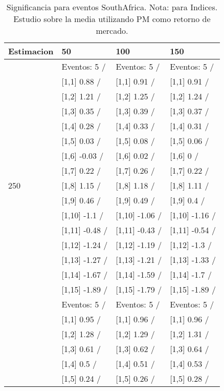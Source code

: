 \begin{table}

\caption{Significancia para eventos SouthAfrica. Nota: para Indices. Estudio sobre la media utilizando PM como retorno de mercado.}
\centering
\begin{tabular}[t]{llll}
\toprule
Estimacion & 50 & 100 & 150\\
\midrule
 & Eventos:  5 / & Eventos:  5 / & Eventos:  5 /\\
 & {}[1,1] 0.88  / & {}[1,1] 0.91  / & {}[1,1] 0.91  /\\
 & {}[1,2] 1.21  / & {}[1,2] 1.25  / & {}[1,2] 1.24  /\\
 & {}[1,3] 0.35  / & {}[1,3] 0.39  / & {}[1,3] 0.37  /\\
 & {}[1,4] 0.28  / & {}[1,4] 0.33  / & {}[1,4] 0.31  /\\
\addlinespace
 & {}[1,5] 0.03  / & {}[1,5] 0.08  / & {}[1,5] 0.06  /\\
 & {}[1,6] -0.03  / & {}[1,6] 0.02  / & {}[1,6] 0  /\\
 & {}[1,7] 0.22  / & {}[1,7] 0.26  / & {}[1,7] 0.22  /\\
250 & {}[1,8] 1.15  / & {}[1,8] 1.18  / & {}[1,8] 1.11  /\\
 & {}[1,9] 0.46  / & {}[1,9] 0.49  / & {}[1,9] 0.4  /\\
\addlinespace
 & {}[1,10] -1.1  / & {}[1,10] -1.06  / & {}[1,10] -1.16  /\\
 & {}[1,11] -0.48  / & {}[1,11] -0.43  / & {}[1,11] -0.54  /\\
 & {}[1,12] -1.24  / & {}[1,12] -1.19  / & {}[1,12] -1.3  /\\
 & {}[1,13] -1.27  / & {}[1,13] -1.21  / & {}[1,13] -1.33  /\\
 & {}[1,14] -1.67  / & {}[1,14] -1.59  / & {}[1,14] -1.7  /\\
\addlinespace
 & {}[1,15] -1.89  / & {}[1,15] -1.79  / & {}[1,15] -1.89  /\\
 & Eventos:  5 / & Eventos:  5 / & Eventos:  5 /\\
 & {}[1,1] 0.95  / & {}[1,1] 0.96  / & {}[1,1] 0.96  /\\
 & {}[1,2] 1.28  / & {}[1,2] 1.29  / & {}[1,2] 1.31  /\\
 & {}[1,3] 0.61  / & {}[1,3] 0.62  / & {}[1,3] 0.64  /\\
\addlinespace
 & {}[1,4] 0.5  / & {}[1,4] 0.51  / & {}[1,4] 0.53  /\\
 & {}[1,5] 0.24  / & {}[1,5] 0.26  / & {}[1,5] 0.28  /\\

\end{tabular}
\end{table}
